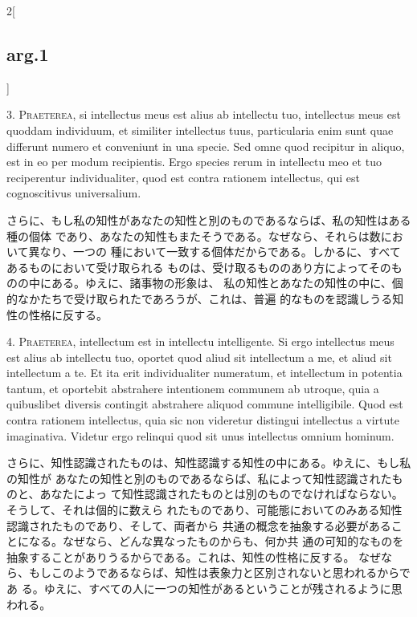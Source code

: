 \documentclass[paper=a4paper,fontsize=10pt,jafontsize=9pt,titlepage]{jlreq}
\begin{document}
\begin{paracol}{2}[\subsection{arg.1}]

3. {\scshape Praeterea}, si intellectus meus est alius ab intellectu tuo,
intellectus meus est quoddam individuum, et similiter intellectus tuus,
particularia enim sunt quae differunt numero et conveniunt in una specie. Sed
omne quod recipitur in aliquo, est in eo per modum recipientis. Ergo species
rerum in intellectu meo et tuo reciperentur individualiter, quod est contra
rationem intellectus, qui est cognoscitivus universalium.

\switchcolumn

さらに、もし私の知性があなたの知性と別のものであるならば、私の知性はある種の個体
であり、あなたの知性もまたそうである。なぜなら、それらは数において異なり、一つの
種において一致する個体だからである。しかるに、すべてあるものにおいて受け取られる
ものは、受け取るもののあり方によってそのものの中にある。ゆえに、諸事物の形象は、
私の知性とあなたの知性の中に、個的なかたちで受け取られたであろうが、これは、普遍
的なものを認識しうる知性の性格に反する。
 

4. {\scshape Praeterea}, intellectum est in intellectu intelligente. Si ergo
intellectus meus est alius ab intellectu tuo, oportet quod aliud sit intellectum
a me, et aliud sit intellectum a te. Et ita erit individualiter numeratum, et
intellectum in potentia tantum, et oportebit abstrahere intentionem communem ab
utroque, quia a quibuslibet diversis contingit abstrahere aliquod commune
intelligibile. Quod est contra rationem intellectus, quia sic non videretur
distingui intellectus a virtute imaginativa. Videtur ergo relinqui quod sit unus
intellectus omnium hominum.

\switchcolumn

さらに、知性認識されたものは、知性認識する知性の中にある。ゆえに、もし私の知性が
あなたの知性と別のものであるならば、私によって知性認識されたものと、あなたによっ
て知性認識されたものとは別のものでなければならない。そうして、それは個的に数えら
れたものであり、可能態においてのみある知性認識されたものであり、そして、両者から
共通の概念を抽象する必要があることになる。なぜなら、どんな異なったものからも、何か共
通の可知的なものを抽象することがありうるからである。これは、知性の性格に反する。
なぜなら、もしこのようであるならば、知性は表象力と区別されないと思われるからであ
る。ゆえに、すべての人に一つの知性があるということが残されるように思われる。
 

\end{paracol}
\end{document}

